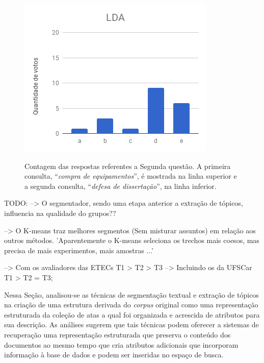 \begin{figure}[!h]
{		\includegraphics[width=.31\textwidth]{conteudo/capitulos/figs/figuras-experimento/C2-Q2-LDA.png}
	}

	\caption{Contagem das respostas referentes a Segunda questão. A primeira consulta, ``\textit{compra de equipamentos}'', é mostrada na linha superior e a segunda consulta, ``\textit{defesa de dissertação}'', na linha inferior.}
	\label{fig:c12-q2}
\end{figure}



{
\small
TODO:
--> O segmentador, sendo uma etapa anterior a extração de tópicos, influencia na qualidade do grupos??

--> O K-means traz melhores segmentos (Sem misturar assuntos) em relação aos outros métodos.  'Aparentemente o K-means seleciona os trechos mais coesos, mas precisa de mais experimentos, mais amostras ...'


--> Com os avaliadores das ETECs T1 > T2 > T3
--> Incluindo os da UFSCar   T1 > T2 = T3;
}





Nessa Seção, analisou-se as técnicas de segmentação textual e extração de tópicos na criação de uma estrutura derivada do \textit{corpus} original como uma representação estruturada da coleção de atas a qual foi organizada e acrescida de atributos para sua descrição. As análises sugerem que tais técnicas podem oferecer a sistemas de recuperação uma representação estruturada que preserva o conteúdo dos documentos ao mesmo tempo que cria atributos adicionais que incorporam informação à base de dados e podem ser inseridas no espaço de busca.  






